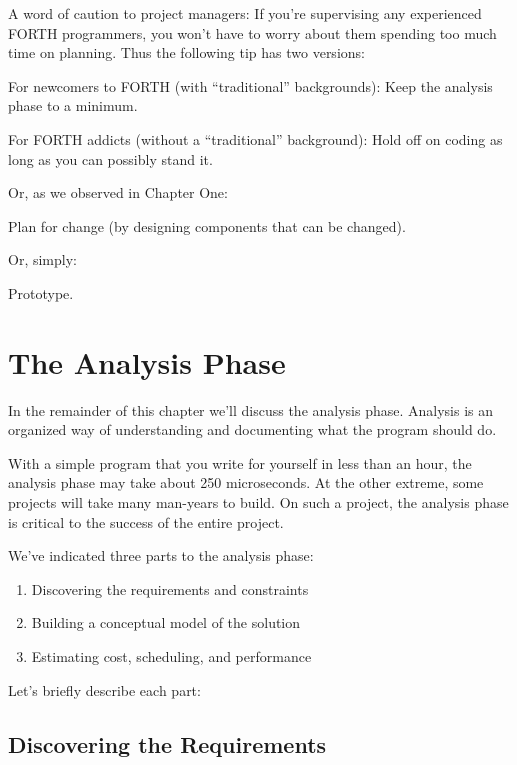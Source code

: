 A word of caution to project managers: If you're supervising any
experienced FORTH programmers, you won't have to worry about them
spending too much time on planning. Thus the following tip has two
versions:

\begin{tip}
For newcomers to FORTH (with ``traditional'' backgrounds):
Keep the analysis phase to a minimum.

For FORTH addicts (without a ``traditional'' background):
Hold off on coding as long as you can possibly stand it.
\end{tip}
Or, as we observed in Chapter One:

\begin{tip}
Plan for change (by designing components that can be changed).
\end{tip}
Or, simply:

\begin{tip}
Prototype.
\end{tip}

\section{The Analysis Phase}

In the remainder of this chapter we'll discuss the analysis phase.
Analysis is an organized way of understanding and documenting what
the program should do.

With a simple program that you write for yourself in less than an
hour, the analysis phase may take about 250 microseconds. At the other
extreme, some projects will take many man-years to build. On such a
project, the analysis phase is critical to the success of the entire project.

We've indicated three parts to the analysis phase:

\begin{enumerate}	%
\item Discovering the requirements and constraints
\item Building a conceptual model of the solution
\item Estimating cost, scheduling, and performance
\end{enumerate}

\noindent Let's briefly describe each part:

\subsection{Discovering the Requirements}


